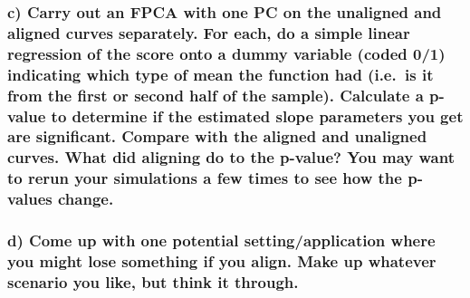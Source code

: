 \documentclass[
]{article}
\begin{document}
\hypertarget{c-carry-out-an-fpca-with-one-pc-on-the-unaligned-and-aligned-curves-separately.-for-each-do-a-simple-linear-regression-of-the-score-onto-a-dummy-variable-coded-01-indicating-which-type-of-mean-the-function-had-i.e.-is-it-from-the-first-or-second-half-of-the-sample.-calculate-a-p-value-to-determine-if-the-estimated-slope-parameters-you-get-are-significant.-compare-with-the-aligned-and-unaligned-curves.-what-did-aligning-do-to-the-p-value-you-may-want-to-rerun-your-simulations-a-few-times-to-see-how-the-p-values-change.}{%
\subsubsection{c) Carry out an FPCA with one PC on the unaligned and
aligned curves separately. For each, do a simple linear regression of
the score onto a dummy variable (coded 0/1) indicating which type of
mean the function had (i.e.~is it from the first or second half of the
sample). Calculate a p-value to determine if the estimated slope
parameters you get are significant. Compare with the aligned and
unaligned curves. What did aligning do to the p-value? You may want to
rerun your simulations a few times to see how the p-values
change.}\label{c-carry-out-an-fpca-with-one-pc-on-the-unaligned-and-aligned-curves-separately.-for-each-do-a-simple-linear-regression-of-the-score-onto-a-dummy-variable-coded-01-indicating-which-type-of-mean-the-function-had-i.e.-is-it-from-the-first-or-second-half-of-the-sample.-calculate-a-p-value-to-determine-if-the-estimated-slope-parameters-you-get-are-significant.-compare-with-the-aligned-and-unaligned-curves.-what-did-aligning-do-to-the-p-value-you-may-want-to-rerun-your-simulations-a-few-times-to-see-how-the-p-values-change.}}

\hypertarget{d-come-up-with-one-potential-settingapplication-where-you-might-lose-something-if-you-align.-make-up-whatever-scenario-you-like-but-think-it-through.}{%
\subsubsection{d) Come up with one potential setting/application where
you might lose something if you align. Make up whatever scenario you
like, but think it
through.}\label{d-come-up-with-one-potential-settingapplication-where-you-might-lose-something-if-you-align.-make-up-whatever-scenario-you-like-but-think-it-through.}}
\end{document}
